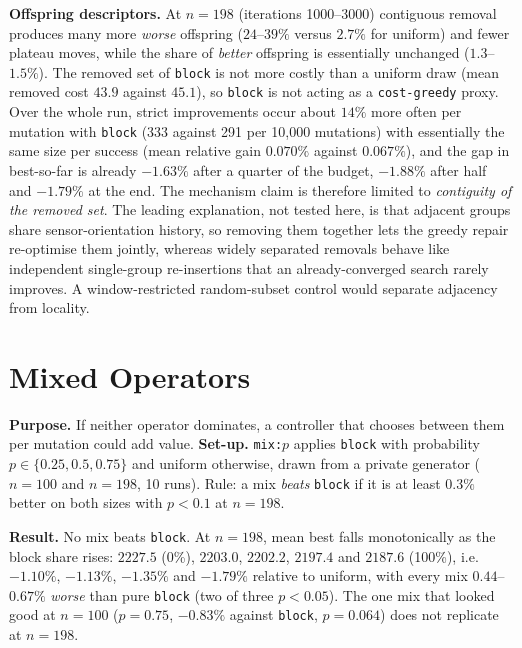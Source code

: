 \textbf{Offspring descriptors.} At $n=198$ (iterations 1000--3000) contiguous removal produces many more \emph{worse} offspring ($24$--$39\%$ versus $2.7\%$ for uniform) and fewer plateau moves, while the share of \emph{better} offspring is essentially unchanged ($1.3$--$1.5\%$). The removed set of \texttt{block} is not more costly than a uniform draw (mean removed cost $43.9$ against $45.1$), so \texttt{block} is not acting as a \texttt{cost-greedy} proxy. Over the whole run, strict improvements occur about $14\%$ more often per mutation with \texttt{block} (333 against 291 per 10{,}000 mutations) with essentially the same size per success (mean relative gain $0.070\%$ against $0.067\%$), and the gap in best-so-far is already $-1.63\%$ after a quarter of the budget, $-1.88\%$ after half and $-1.79\%$ at the end. The mechanism claim is therefore limited to \emph{contiguity of the removed set}. The leading explanation, not tested here, is that adjacent groups share sensor-orientation history, so removing them together lets the greedy repair re-optimise them jointly, whereas widely separated removals behave like independent single-group re-insertions that an already-converged search rarely improves. A window-restricted random-subset control would separate adjacency from locality.


\section{Mixed Operators}\label{sec:exp-mix}

\textbf{Purpose.} If neither operator dominates, a controller that chooses between them per mutation could add value. \textbf{Set-up.} \texttt{mix:}$p$ applies \texttt{block} with probability $p\in\{0.25,0.5,0.75\}$ and uniform otherwise, drawn from a private generator ($n=100$ and $n=198$, 10 runs). Rule: a mix \emph{beats} \texttt{block} if it is at least $0.3\%$ better on both sizes with $p<0.1$ at $n=198$.

\textbf{Result.} No mix beats \texttt{block}. At $n=198$, mean best falls monotonically as the block share rises: $2227.5$ (0\%), $2203.0$, $2202.2$, $2197.4$ and $2187.6$ (100\%), i.e.\ $-1.10\%$, $-1.13\%$, $-1.35\%$ and $-1.79\%$ relative to uniform, with every mix $0.44$--$0.67\%$ \emph{worse} than pure \texttt{block} (two of three $p<0.05$). The one mix that looked good at $n=100$ ($p=0.75$, $-0.83\%$ against \texttt{block}, $p=0.064$) does not replicate at $n=198$.

